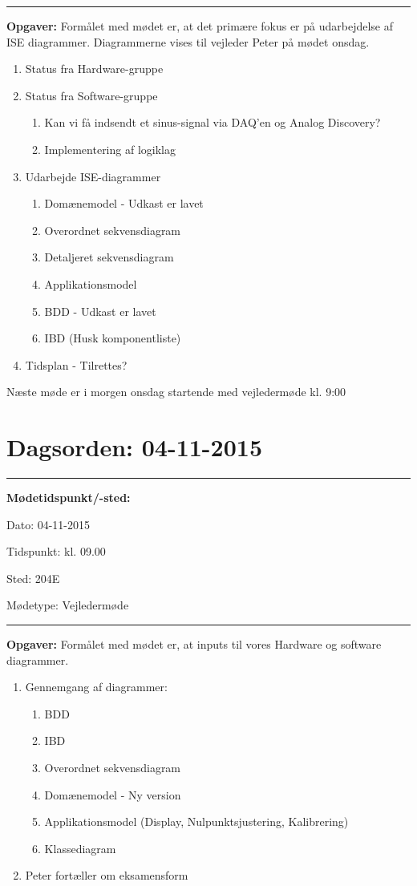 \hrule
\textbf{Opgaver:} \newline
Formålet med mødet er, at det primære fokus er på udarbejdelse af ISE diagrammer. Diagrammerne vises til vejleder Peter på mødet onsdag.
\begin{enumerate}
\item Status fra Hardware-gruppe

\item Status fra Software-gruppe
\begin{enumerate}
\item Kan vi få indsendt et sinus-signal via DAQ'en og Analog Discovery?
\item Implementering af logiklag
\end{enumerate}

\item Udarbejde ISE-diagrammer
\begin{enumerate}
\item Domænemodel - Udkast er lavet
\item Overordnet sekvensdiagram
\item Detaljeret sekvensdiagram
\item Applikationsmodel
\item BDD - Udkast er lavet
\item IBD (Husk komponentliste)
\end{enumerate}
\item Tidsplan - Tilrettes?
\end{enumerate}
Næste møde er i morgen onsdag startende med vejledermøde kl. 9:00

\newpage
\section{Dagsorden: 04-11-2015}
\hrule



\textbf{Mødetidspunkt/-sted:} 

Dato: \tabto{7em} 04-11-2015

Tidspunkt: \tabto{7em} kl. 09.00

Sted: \tabto{7em} 204E

Mødetype: \tabto{7em} Vejledermøde \newline


\hrule
\textbf{Opgaver:} \newline
Formålet med mødet er, at inputs til vores Hardware og software diagrammer.
\begin{enumerate}
\item Gennemgang af diagrammer:
\begin{enumerate}
\item BDD
\item IBD
\item Overordnet sekvensdiagram
\item Domænemodel - Ny version
\item Applikationsmodel (Display, Nulpunktsjustering, Kalibrering)
\item Klassediagram
\end{enumerate}
\item Peter fortæller om eksamensform
\end{enumerate}


